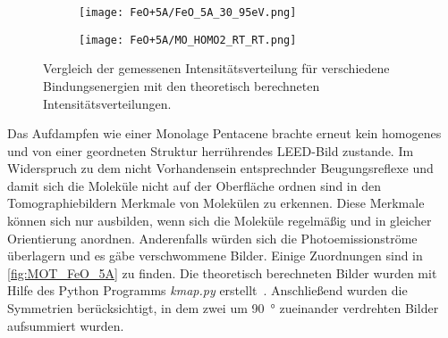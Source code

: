 \begin{figure}
\begin{subfigure}[t]{0.48\textwidth}
                \label{fig:MOT_FeO+5A_theo_3}
            \end{subfigure}
            \centering
            \begin{subfigure}[t]{0.48\textwidth}
                \centering
                \texttt{[image: FeO+5A/FeO\_5A\_30\_95eV.png]}
                \label{fig:MOT_FeO+5A_exp_4}
            \end{subfigure}
            \begin{subfigure}[t]{0.48\textwidth}
                \centering
                \texttt{[image: FeO+5A/MO\_HOMO2\_RT\_RT.png]}
                \label{fig:MOT_FeO+5A_theo_4}
            \end{subfigure}
            \caption{Vergleich der gemessenen Intensitätsverteilung für verschiedene Bindungsenergien mit den theoretisch berechneten Intensitätsverteilungen.}
            \label{fig:MOT_FeO_5A}
        \end{figure}
        Das Aufdampfen wie einer Monolage Pentacene brachte erneut kein homogenes und von einer geordneten Struktur herrührendes LEED-Bild zustande.
        Im Widerspruch zu dem nicht Vorhandensein entsprechnder Beugungsreflexe und damit sich die Moleküle nicht auf der Oberfläche ordnen sind in den Tomographiebildern Merkmale von Molekülen zu erkennen.
        Diese Merkmale können sich nur ausbilden, wenn sich die Moleküle regelmäßig und in gleicher Orientierung anordnen.
        Anderenfalls würden sich die Photoemissionströme überlagern und es gäbe verschwommene Bilder.
        Einige Zuordnungen sind in \autoref{fig:MOT_FeO_5A} zu finden.
        Die theoretisch berechneten Bilder wurden mit Hilfe des Python Programms \textit{kmap.py} erstellt~\cite{brandstetter_kmappy_2021}.
        Anschließend wurden die Symmetrien berücksichtigt, in dem zwei um \SI{90}{\degree} zueinander verdrehten Bilder aufsummiert wurden.

